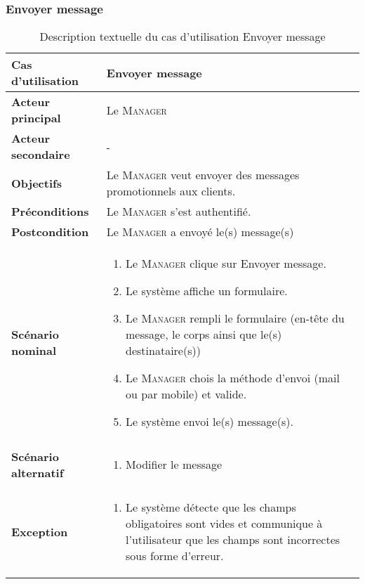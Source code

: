         \subsubsection[Établir rapport]{Envoyer message}
        \begin{longtable}{p{4cm} p{9cm}}
            \caption{Description textuelle du cas d’utilisation Envoyer message}
            \label{table:usecaseEtablirCompte}
            \\\hline\hline
                \textbf{Cas d’utilisation} & \textbf{Envoyer message}
            \\\hline\hline
                    \textbf{Acteur principal} & Le \textsc{Manager}
                \\
                    \textbf{Acteur secondaire} & -
                \\
                    \textbf{Objectifs} & Le \textsc{Manager} veut envoyer des messages 
                    promotionnels aux clients.
                \\
                    \textbf{Préconditions} & Le \textsc{Manager} s’est authentifié.
                \\
                    \textbf{Postcondition} & Le \textsc{Manager} a envoyé le(s) message(s)
                \\
                \textbf{Scénario nominal} &
                    \begin{enumerate}[leftmargin=*]
                        \item Le \textsc{Manager} clique sur Envoyer message.
                        \item Le système affiche un formulaire.
                        \item Le \textsc{Manager} rempli le formulaire (en-tête du message, le corps
                        ainsi que le(s) destinataire(s))
                        \item Le \textsc{Manager} chois la méthode d’envoi (mail ou par mobile) et valide.
                        \item Le système envoi le(s) message(s).
                    \end{enumerate}
                \\
                \textbf{Scénario alternatif} &
                    \begin{enumerate}[leftmargin=*]
                        \item Modifier le message
                    \end{enumerate}
                \\
                \textbf{Exception} &
                    \begin{enumerate}[leftmargin=*]
                        \item Le système détecte que les champs obligatoires sont vides
                        et communique à l’utilisateur que les champs sont incorrectes sous forme d’erreur.
                    \end{enumerate}
            \\\bottomrule
        \end{longtable}

